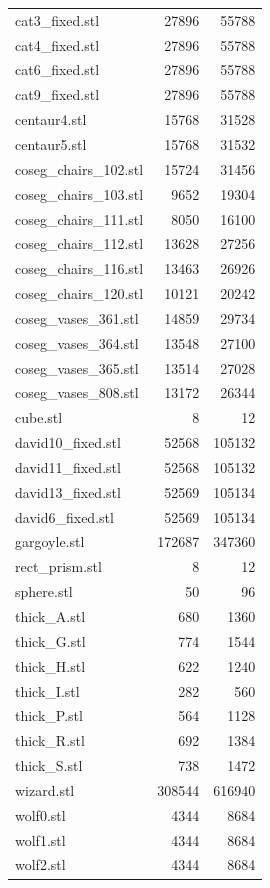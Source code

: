 \begin{tabular}{lrr}
cat3\_fixed.stl & 27896 & 55788 \\
cat4\_fixed.stl & 27896 & 55788 \\
cat6\_fixed.stl & 27896 & 55788 \\
cat9\_fixed.stl & 27896 & 55788 \\
centaur4.stl & 15768 & 31528 \\
centaur5.stl & 15768 & 31532 \\
coseg\_chairs\_102.stl & 15724 & 31456 \\
coseg\_chairs\_103.stl & 9652 & 19304 \\
coseg\_chairs\_111.stl & 8050 & 16100 \\
coseg\_chairs\_112.stl & 13628 & 27256 \\
coseg\_chairs\_116.stl & 13463 & 26926 \\
coseg\_chairs\_120.stl & 10121 & 20242 \\
coseg\_vases\_361.stl & 14859 & 29734 \\
coseg\_vases\_364.stl & 13548 & 27100 \\
coseg\_vases\_365.stl & 13514 & 27028 \\
coseg\_vases\_808.stl & 13172 & 26344 \\
cube.stl & 8 & 12 \\
david10\_fixed.stl & 52568 & 105132 \\
david11\_fixed.stl & 52568 & 105132 \\
david13\_fixed.stl & 52569 & 105134 \\
david6\_fixed.stl & 52569 & 105134 \\
gargoyle.stl & 172687 & 347360 \\
rect\_prism.stl & 8 & 12 \\
sphere.stl & 50 & 96 \\
thick\_A.stl & 680 & 1360 \\
thick\_G.stl & 774 & 1544 \\
thick\_H.stl & 622 & 1240 \\
thick\_I.stl & 282 & 560 \\
thick\_P.stl & 564 & 1128 \\
thick\_R.stl & 692 & 1384 \\
thick\_S.stl & 738 & 1472 \\
wizard.stl & 308544 & 616940 \\
wolf0.stl & 4344 & 8684 \\
wolf1.stl & 4344 & 8684 \\
wolf2.stl & 4344 & 8684 \\
\bottomrule
\end{tabular}
